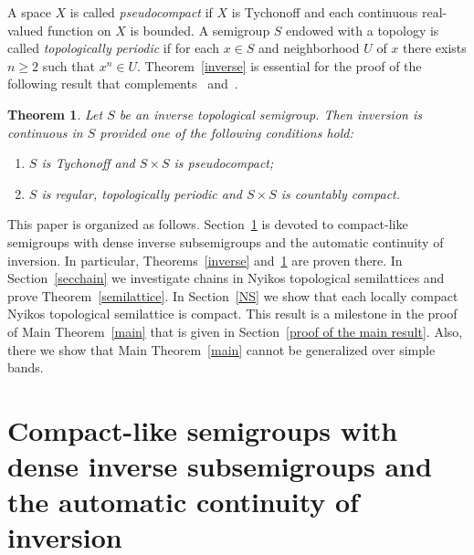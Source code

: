 \documentclass[12pt, twoside, leqno]{article}
\newtheorem{theorem}{Theorem}[section]
\newtheorem{corollary}[theorem]{Corollary}
\theoremstyle{definition}
\numberwithin{equation}{section}
\begin{document}
A space $X$ is called {\em pseudocompact} if $X$ is Tychonoff and each continuous real-valued function on $X$ is bounded.
A semigroup $S$ endowed with a topology is called {\em topologically periodic} if for each $x\in S$ and neighborhood $U$ of $x$ there exists $n\geq 2$ such that $x^n\in U$. 
Theorem~\ref{inverse} is essential for the proof of the following result that complements~\cite[Theorem 2]{BG} and~\cite[Theorem 1]{GR}.

\begin{theorem}\label{autinv}
Let $S$ be an inverse topological semigroup. Then inversion is continuous in $S$ provided one of the following conditions hold:
\begin{enumerate}[label=(\roman*)]
   \item $S$ is Tychonoff and $S{\times}S$ is pseudocompact;
    \item $S$ is regular, topologically periodic and $S{\times}S$ is countably compact.
\end{enumerate}   
\end{theorem}










This paper is organized as follows. Section~\ref{inver} is devoted to compact-like semigroups with dense inverse subsemigroups and the automatic continuity of inversion. In particular, Theorems~\ref{inverse} and~\ref{autinv} are proven there. In Section~\ref{secchain} we investigate chains in Nyikos topological semilattices and prove Theorem~\ref{semilattice}. In Section~\ref{NS} we show that each locally compact Nyikos topological semilattice is compact. This result is a milestone in the proof of Main Theorem~\ref{main} that is given in Section~\ref{proof of the main result}. Also, there we show that Main Theorem~\ref{main} cannot be generalized over simple bands.


\section{Compact-like semigroups with dense inverse subsemigroups and the automatic continuity of inversion}\label{inver}
\end{document}
